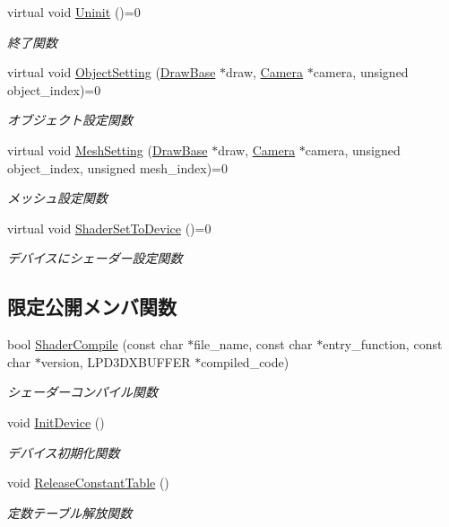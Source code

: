 \begin{DoxyCompactItemize}
virtual void \mbox{\hyperlink{class_shader_base_a784edfa81bec4d08a257ed4f02c61222}{Uninit}} ()=0
\begin{DoxyCompactList}\small\item\em 終了関数 \end{DoxyCompactList}\item 
virtual void \mbox{\hyperlink{class_shader_base_a054bc5e129619ec976740e0698ef9a8b}{Object\+Setting}} (\mbox{\hyperlink{class_draw_base}{Draw\+Base}} $\ast$draw, \mbox{\hyperlink{class_camera}{Camera}} $\ast$camera, unsigned object\+\_\+index)=0
\begin{DoxyCompactList}\small\item\em オブジェクト設定関数 \end{DoxyCompactList}\item 
virtual void \mbox{\hyperlink{class_shader_base_a04f6ce27a707f4040e8abe48f9840951}{Mesh\+Setting}} (\mbox{\hyperlink{class_draw_base}{Draw\+Base}} $\ast$draw, \mbox{\hyperlink{class_camera}{Camera}} $\ast$camera, unsigned object\+\_\+index, unsigned mesh\+\_\+index)=0
\begin{DoxyCompactList}\small\item\em メッシュ設定関数 \end{DoxyCompactList}\item 
virtual void \mbox{\hyperlink{class_shader_base_a78e5b6f343821648409d50653e0105e2}{Shader\+Set\+To\+Device}} ()=0
\begin{DoxyCompactList}\small\item\em デバイスにシェーダー設定関数 \end{DoxyCompactList}\end{DoxyCompactItemize}
\subsection*{限定公開メンバ関数}
\begin{DoxyCompactItemize}
\item 
bool \mbox{\hyperlink{class_shader_base_ac6e791440374f97592cfb4cb36f4fa55}{Shader\+Compile}} (const char $\ast$file\+\_\+name, const char $\ast$entry\+\_\+function, const char $\ast$version, L\+P\+D3\+D\+X\+B\+U\+F\+F\+ER $\ast$compiled\+\_\+code)
\begin{DoxyCompactList}\small\item\em シェーダーコンパイル関数 \end{DoxyCompactList}\item 
void \mbox{\hyperlink{class_shader_base_aaac3419f1fce5bf12973e827daadbf8c}{Init\+Device}} ()
\begin{DoxyCompactList}\small\item\em デバイス初期化関数 \end{DoxyCompactList}\item 
void \mbox{\hyperlink{class_shader_base_a30b6fc2252b39598f36e91aec1a207e7}{Release\+Constant\+Table}} ()
\begin{DoxyCompactList}\small\item\em 定数テーブル解放関数 \end{DoxyCompactList}\end{DoxyCompactItemize}
